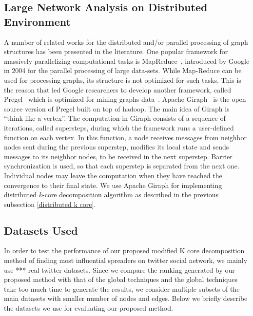 \documentclass[sigconf]{acmart}
\begin{document}
\subsection{Large Network Analysis on Distributed Environment}
A number of related works for the distributed and/or parallel processing of graph structures has been presented in the literature. One popular framework for massively parallelizing
computational tasks is MapReduce~\cite{dean2008mapreduce}, introduced by Google in 2004 for the parallel processing of large data-sets. While Map-Reduce can be used for processing graphs, its structure is not optimized for such tasks. This is the reason that led Google researchers to develop another framework, called Pregel~\cite{malewicz2010pregel} which is optimized for mining graphs data~\cite{han2014experimental}. Apache Giraph~\cite{martella2012apache,martella2015practical} is the open source version of Pregel built on top of hadoop. The main idea of Giraph is ``think like a vertex''. The computation in Giraph consists of a sequence of iterations, called supersteps, during which the framework runs a user-defined function on each vertex. In this function, a node receives messages from neighbor nodes sent during the previous superstep, modifies its local state and sends messages to its neighbor nodes, to be received in the next superstep. Barrier synchronization is used, so that each superstep is separated from the next one. Individual nodes may leave the computation when they have reached the convergence to their final state.
We use Apache Giraph for implementing distributed $k$-core decomposition algorithm as described in the previous subsection \ref{distributed k core}.


\subsection{Datasets Used}
In order to test the performance of our proposed modified K core decomposition method of finding most influential spreaders on twitter social network, we mainly use *** real twitter datasets. Since we compare the ranking generated by our proposed method with that of the global techniques and the global techniques take too much time to generate the results, we consider multiple subsets of the main datasets with smaller number of nodes and edges. Below we briefly describe the datasets we use for evaluating our proposed method.
\end{document}

